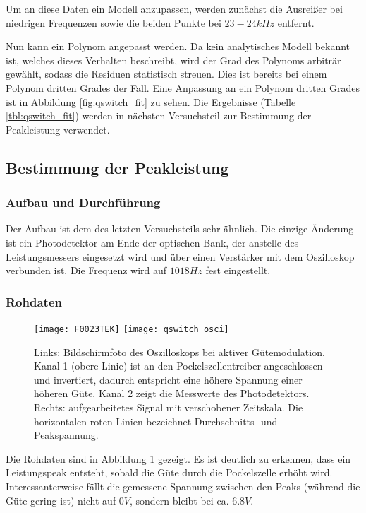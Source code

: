 \documentclass{../Misc/MontavonLaTeX/Montavon}
\newcommand{\halfwidth}{0.48\textwidth}
\begin{document}
Um an diese Daten ein Modell anzupassen, werden zunächst die Ausreißer bei niedrigen Frequenzen sowie die beiden Punkte bei $23 - 24 \unit{kHz}$ entfernt.

Nun kann ein Polynom angepasst werden. Da kein analytisches Modell bekannt ist, welches dieses Verhalten beschreibt, wird der Grad des Polynoms arbiträr gewählt, sodass die Residuen statistisch streuen. Dies ist bereits bei einem Polynom dritten Grades der Fall. 
Eine Anpassung an ein Polynom dritten Grades ist in Abbildung \ref{fig:qswitch_fit} zu sehen.
Die Ergebnisse (Tabelle \ref{tbl:qswitch_fit}) werden in nächsten Versuchsteil zur Bestimmung der Peakleistung verwendet. 

\subsection{Bestimmung der Peakleistung}
\subsubsection{Aufbau und Durchführung}

Der Aufbau ist dem des letzten Versuchsteils sehr ähnlich. Die einzige Änderung ist ein Photodetektor am Ende der optischen Bank, der anstelle des Leistungsmessers eingesetzt wird und über einen Verstärker mit dem Oszilloskop verbunden ist. Die Frequenz wird auf $1018 \unit{Hz}$ fest eingestellt.

\subsubsection{Rohdaten}
\begin{figure}[htbp]
\centering
\texttt{[image: F0023TEK]}
\texttt{[image: qswitch\_osci]}
\caption{Links: Bildschirmfoto des Oszilloskops bei aktiver Gütemodulation. Kanal 1 (obere Linie) ist an den Pockelszellentreiber angeschlossen und invertiert, dadurch entspricht eine höhere Spannung einer höheren Güte. Kanal 2 zeigt die Messwerte des Photodetektors. Rechts: aufgearbeitetes Signal mit verschobener Zeitskala. Die horizontalen roten Linien bezeichnet Durchschnitts- und Peakspannung.}
\label{fig:qswitch_osci}
\end{figure}

Die Rohdaten sind in Abbildung \ref{fig:qswitch_osci} gezeigt. Es ist deutlich zu erkennen, dass ein Leistungspeak entsteht, sobald die Güte durch die Pockelszelle erhöht wird. Interessanterweise fällt die gemessene Spannung zwischen den Peaks (während die Güte gering ist) nicht auf $0 V$, sondern bleibt bei ca. $6.8 V$.
\end{document}
